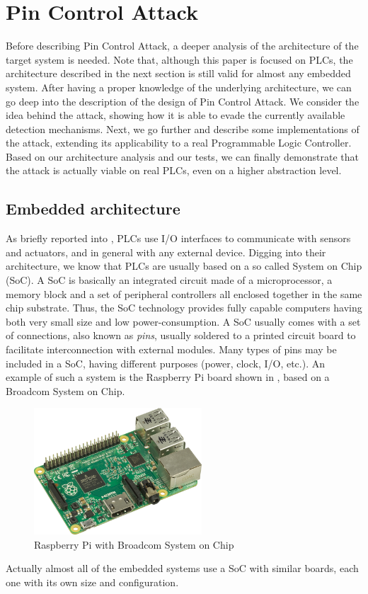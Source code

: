 \chapter{Pin Control Attack}
\label{chap:attack}

Before describing Pin Control Attack, a deeper analysis of the architecture of the target system is needed.
Note that, although this paper is focused on PLCs, the architecture described in the next section is still valid for almost any embedded system.
After having a proper knowledge of the underlying architecture, we can go deep into the description of the design of Pin Control Attack.
We consider the idea behind the attack, showing how it is able to evade the currently available detection mechanisms.
Next, we go further and describe some implementations of the attack, extending its applicability to a real Programmable Logic Controller.
Based on our architecture analysis and our tests, we can finally demonstrate that the attack is actually viable on real PLCs, even on a higher abstraction level.


\section{Embedded architecture}
\label{sec:embed_arch}

As briefly reported into , PLCs use I/O interfaces to communicate with sensors and actuators, and in general with any external device.
Digging into their architecture, we know that PLCs are usually based on a so called System on Chip (SoC).
A SoC is basically an integrated circuit made of a microprocessor, a memory block and a set of peripheral controllers all enclosed together in the same chip substrate.
Thus, the SoC technology provides fully capable computers having both very small size and low power-consumption.
A SoC usually comes with a set of connections, also known as \emph{pins}, usually soldered to a printed circuit board to facilitate interconnection with external modules.
Many types of pins may be included in a SoC, having different purposes (power, clock, I/O, etc.).
An example of such a system is the Raspberry Pi board shown in , based on a Broadcom System on Chip.
\begin{figure}[h]
\centerline{\includegraphics[width=0.56\textwidth]{res/raspberry}}
\caption{Raspberry Pi \cite{raspberry} with Broadcom System on Chip \label{fig:raspberry}}
\end{figure}
Actually almost all of the embedded systems use a SoC with similar boards, each one with its own size and configuration.

